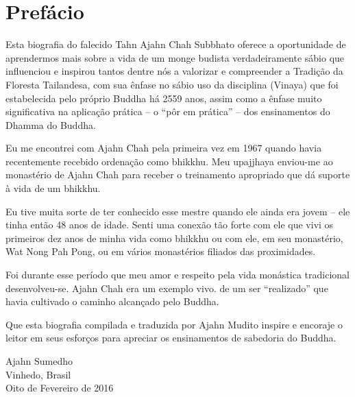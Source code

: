 \chapter{Prefácio}

\enlargethispage{\baselineskip}

Esta biografia do falecido Tahn Ajahn Chah Subbhato oferece a oportunidade de
aprendermos mais sobre a vida de um monge budista verdadeiramente sábio que
influenciou e inspirou tantos dentre nós a valorizar e compreender a Tradição da
Floresta Tailandesa, com sua ênfase no sábio uso da disciplina (Vinaya) que foi
estabelecida pelo próprio Buddha há 2559 anos, assim como a ênfase muito
significativa na aplicação prática -- o ``pôr em prática'' -- dos ensinamentos
do Dhamma do Buddha.

Eu me encontrei com Ajahn Chah pela primeira vez em 1967 quando havia
recentemente recebido ordenação como bhikkhu. Meu upajjhaya enviou-me ao
monastério de Ajahn Chah para receber o treinamento apropriado que dá suporte à
vida de um bhikkhu.

Eu tive muita sorte de ter conhecido esse mestre quando ele ainda era jovem --
ele tinha então 48 anos de idade. Senti uma conexão tão forte com ele que vivi
os primeiros dez anos de minha vida como bhikkhu ou com ele, em seu monastério,
Wat Nong Pah Pong, ou em vários monastérios filiados das proximidades.

Foi durante esse período que meu amor e respeito pela vida monástica tradicional
desenvolveu-se. Ajahn Chah era um exemplo vivo. de um ser ``realizado'' que havia
cultivado o caminho alcançado pelo Buddha.

Que esta biografia compilada e traduzida por Ajahn Mudito inspire e encoraje o
leitor em seus esforços para apreciar os ensinamentos de sabedoria do Buddha.

\bigskip

{\raggedleft
Ajahn Sumedho\\
Vinhedo, Brasil\\
Oito de Fevereiro de 2016
\par}
